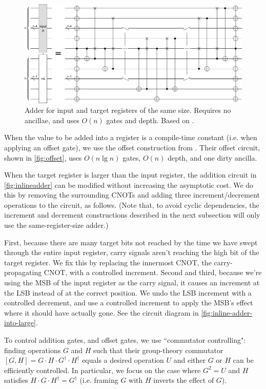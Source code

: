 \documentclass[twocolumn,longbibliography]{quantumarticle-customized}
\begin{document}
\begin{figure}
  \centering
  \includegraphics[width=\linewidth]{assets/inline-adder.png}
  \caption{ Adder for input and target registers of the same size.
  Requires no ancillae, and uses $O(n)$ gates and depth.
  Based on \cite{van2004, takahashi2005}.}
  \label{fig:inlineadder}
\end{figure}

When the value to be added into a register is a compile-time constant (i.e. when applying an offset gate), we use the offset construction from \cite{haner2016}.
Their offset circuit, shown in \autoref{fig:offset}, uses $O(n \lg n)$ gates, $O(n)$ depth, and one dirty ancilla.

When the target register is larger than the input register, the addition circuit in \autoref{fig:inlineadder} can be modified without increasing the asymptotic cost.
We do this by removing the surrounding CNOTs and adding three increment/decrement operations to the circuit, as follows.
(Note that, to avoid cyclic dependencies, the increment and decrement constructions described in the next subsection will only use the same-register-size adder.)

First, because there are many target bits not reached by the time we have swept through the entire input register, carry signals aren't reaching the high bit of the target register.
We fix this by replacing the innermost CNOT, the carry-propagating CNOT, with a controlled increment.
Second and third, because we're using the MSB of the input register as the carry signal, it causes an increment at the LSB instead of at the correct position.
We undo the LSB increment with a controlled decrement, and use a controlled increment to apply the MSB's effect where it should have actually gone.
See the circuit diagram in \autoref{fig:inline-adder-into-large}.

To control addition gates, and offset gates, we use ``commutator controlling": finding operations $G$ and $H$ such that their group-theory commutator $[G, H] = G \cdot H \cdot G^\dagger \cdot H^\dagger$ equals a desired operation $U$ and either $G$ or $H$ can be efficiently controlled.
In particular, we focus on the case where $G^2 = U$ and $H$ satisfies $H \cdot G \cdot H^\dagger = G^\dagger$ (i.e. framing $G$ with $H$ inverts the effect of $G$).
\end{document}
